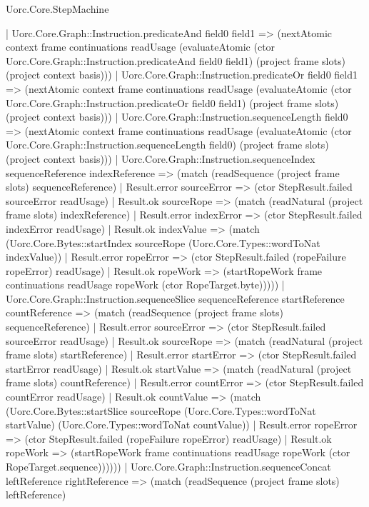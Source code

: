 \begin{lexlean}{Uorc.Core.StepMachine}
\begin{semanticmodule}
{      | Uorc.Core.Graph::Instruction.predicateAnd field0 field1 => (nextAtomic context frame continuations readUsage (evaluateAtomic (ctor Uorc.Core.Graph::Instruction.predicateAnd field0 field1) (project frame slots) (project context basis)))
      | Uorc.Core.Graph::Instruction.predicateOr field0 field1 => (nextAtomic context frame continuations readUsage (evaluateAtomic (ctor Uorc.Core.Graph::Instruction.predicateOr field0 field1) (project frame slots) (project context basis)))
      | Uorc.Core.Graph::Instruction.sequenceLength field0 => (nextAtomic context frame continuations readUsage (evaluateAtomic (ctor Uorc.Core.Graph::Instruction.sequenceLength field0) (project frame slots) (project context basis)))
      | Uorc.Core.Graph::Instruction.sequenceIndex sequenceReference indexReference => (match (readSequence (project frame slots) sequenceReference)
        | Result.error sourceError => (ctor StepResult.failed sourceError readUsage)
        | Result.ok sourceRope => (match (readNatural (project frame slots) indexReference)
          | Result.error indexError => (ctor StepResult.failed indexError readUsage)
          | Result.ok indexValue => (match (Uorc.Core.Bytes::startIndex sourceRope (Uorc.Core.Types::wordToNat indexValue))
            | Result.error ropeError => (ctor StepResult.failed (ropeFailure ropeError) readUsage)
            | Result.ok ropeWork => (startRopeWork frame continuations readUsage ropeWork (ctor RopeTarget.byte)))))
      | Uorc.Core.Graph::Instruction.sequenceSlice sequenceReference startReference countReference => (match (readSequence (project frame slots) sequenceReference)
        | Result.error sourceError => (ctor StepResult.failed sourceError readUsage)
        | Result.ok sourceRope => (match (readNatural (project frame slots) startReference)
          | Result.error startError => (ctor StepResult.failed startError readUsage)
          | Result.ok startValue => (match (readNatural (project frame slots) countReference)
            | Result.error countError => (ctor StepResult.failed countError readUsage)
            | Result.ok countValue => (match (Uorc.Core.Bytes::startSlice sourceRope (Uorc.Core.Types::wordToNat startValue) (Uorc.Core.Types::wordToNat countValue))
              | Result.error ropeError => (ctor StepResult.failed (ropeFailure ropeError) readUsage)
              | Result.ok ropeWork => (startRopeWork frame continuations readUsage ropeWork (ctor RopeTarget.sequence))))))
      | Uorc.Core.Graph::Instruction.sequenceConcat leftReference rightReference => (match (readSequence (project frame slots) leftReference)
}
\end{semanticmodule}
\end{lexlean}
